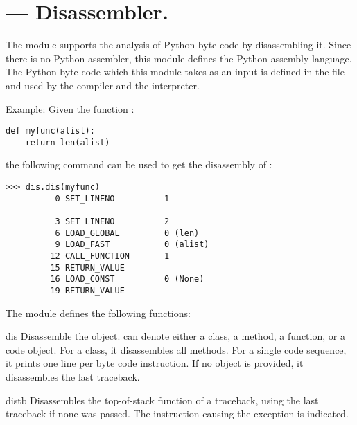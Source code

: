 \section{ ---
         Disassembler.}



The  module supports the analysis of Python byte code by
disassembling it.  Since there is no Python assembler, this module
defines the Python assembly language.  The Python byte code which
this module takes as an input is defined in the file 
 and used by the compiler and the interpreter.

Example: Given the function :

\begin{verbatim}
def myfunc(alist):
    return len(alist)
\end{verbatim}

the following command can be used to get the disassembly of
:

\begin{verbatim}
>>> dis.dis(myfunc)
          0 SET_LINENO          1

          3 SET_LINENO          2
          6 LOAD_GLOBAL         0 (len)
          9 LOAD_FAST           0 (alist)
         12 CALL_FUNCTION       1
         15 RETURN_VALUE   
         16 LOAD_CONST          0 (None)
         19 RETURN_VALUE   
\end{verbatim}

The  module defines the following functions:

\begin{funcdesc}{dis}{}
Disassemble the  object.  can denote
either a class, a method, a function, or a code object.  For a class,
it disassembles all methods.  For a single code sequence, it prints
one line per byte code instruction.  If no object is provided, it
disassembles the last traceback.
\end{funcdesc}

\begin{funcdesc}{distb}{}
Disassembles the top-of-stack function of a traceback, using the last
traceback if none was passed.  The instruction causing the exception
is indicated.
\end{funcdesc}

